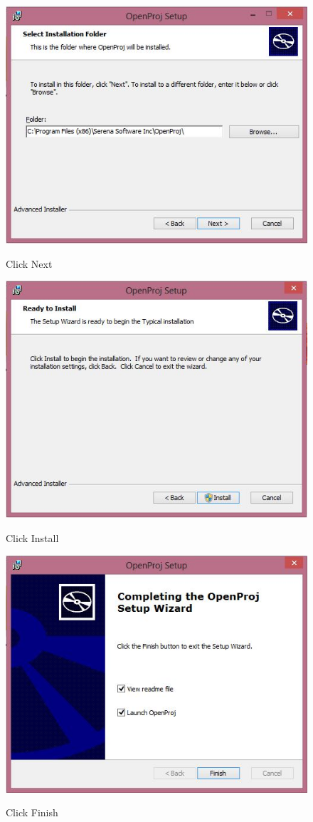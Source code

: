 \begin{figure}[!th]
\centering
\includegraphics[width=0.7\linewidth]{input/images/image32.jpeg}
\label{fig:image1}
\caption{Click Next}
\end{figure}

\begin{figure}[!th]
\centering
\includegraphics[width=0.7\linewidth]{input/images/image33.jpeg}
\label{fig:image1}
\caption{Click Install}
\end{figure}

\begin{figure}[!th]
\centering
\includegraphics[width=0.7\linewidth]{input/images/image34.jpeg}
\label{fig:image1}
\caption{Click Finish}
\end{figure}

